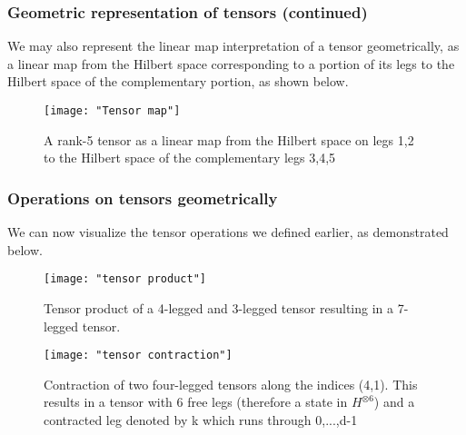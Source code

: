 \documentclass[11pt]{beamer}
\begin{document}
\begin{frame}
	
	\frametitle{Geometric representation of tensors (continued)}
	
	We may also represent the linear map interpretation of a tensor geometrically, as a linear map from the Hilbert space corresponding to a portion of its legs to the Hilbert space of the complementary portion, as shown below. 

\begin{figure}
	\centering
	\texttt{[image: "Tensor map"]}
	\caption{A rank-5 tensor as a linear map from the Hilbert space on legs 1,2 to the Hilbert space of the complementary legs 3,4,5}
	\label{fig:tensor-map}
\end{figure}
	
	
	
\end{frame}


\begin{frame}
	
	\frametitle{Operations on tensors geometrically}

	We can now visualize the tensor operations we defined earlier, as demonstrated below.
	
\begin{figure}
	\centering
	\texttt{[image: "tensor product"]}
	\caption{Tensor product of a 4-legged and 3-legged tensor resulting in a 7-legged tensor.}
	\label{fig:tensor-product}
\end{figure}
	
	\begin{figure}
		\centering
		\texttt{[image: "tensor contraction"]}
		\caption{Contraction of two four-legged tensors along the indices (4,1). This results in a tensor with 6 free legs (therefore a state in $ H^{\otimes 6} $) and a contracted leg denoted by k which runs through 0,...,d-1}
		\label{fig:tensor-contraction}
	\end{figure}
	
	

\end{frame}
\end{document}
